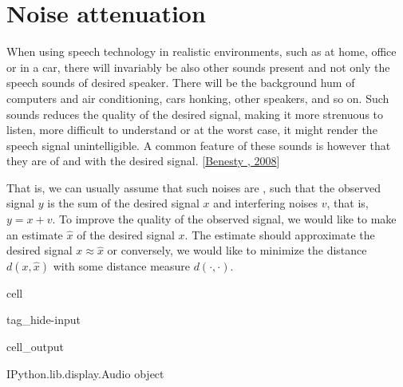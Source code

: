 \documentclass[letterpaper,10pt,english]{jupyterBook}
\begin{document}
\section{Noise attenuation}
\label{\detokenize{Enhancement/Noise_attenuation:noise-attenuation}}\label{\detokenize{Enhancement/Noise_attenuation::doc}}
\sphinxAtStartPar
When using speech technology in realistic environments, such as at home,
office or in a car, there will invariably be also other sounds present
and not only the speech sounds of desired speaker. There will be the
background hum of computers and air conditioning, cars honking, other
speakers, and so on. Such sounds reduces the quality of the desired
signal, making it more strenuous to listen, more difficult to understand
or at the worst case, it might render the speech signal unintelligible.
A common feature of these sounds is however that they are 
of and  with the desired signal. {[}\hyperlink{cite.Enhancement/Noise_attenuation:id41}{Benesty , 2008}{]}

\sphinxAtStartPar
That is, we can usually assume that such noises are , such
that the observed signal \(y\) is the sum of the desired signal \(x\) and
interfering noises \(v\), that is, \(y=x+v\). To improve the quality of the
observed signal, we would like to make an estimate \( \hat x \) of
the desired signal \(x\). The estimate should approximate the desired
signal \( x\approx \hat x \) or conversely, we would like to
minimize the distance \( d\left(x,\hat x\right) \) with some
distance measure \(d(\cdot,\cdot)\).

\begin{sphinxuseclass}{cell}
\begin{sphinxuseclass}{tag_hide-input}\begin{sphinxVerbatimOutput}

\begin{sphinxuseclass}{cell_output}
\begin{sphinxVerbatim}[commandchars=\\\{\}]
\PYGZlt{}IPython.lib.display.Audio object\PYGZgt{}
\end{sphinxVerbatim}

\noindent{}

\end{sphinxuseclass}\end{sphinxVerbatimOutput}

\end{sphinxuseclass}
\end{sphinxuseclass}
\end{document}
